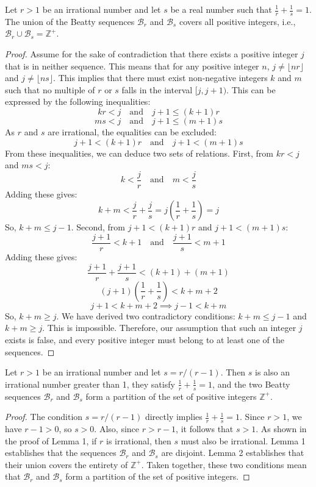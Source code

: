 \begin{lemma}
Let $r > 1$ be an irrational number and let $s$ be a real number such that $\frac{1}{r} + \frac{1}{s} = 1$. The union of the Beatty sequences $\mathcal{B}_r$ and $\mathcal{B}_s$ covers all positive integers, i.e., $\mathcal{B}_r \cup \mathcal{B}_s = \mathbb{Z}^+$.
\end{lemma}

\begin{proof}
Assume for the sake of contradiction that there exists a positive integer $j$ that is in neither sequence. This means that for any positive integer $n$, $j \neq \lfloor nr \rfloor$ and $j \neq \lfloor ns \rfloor$.
This implies that there must exist non-negative integers $k$ and $m$ such that no multiple of $r$ or $s$ falls in the interval $[j, j+1)$.
This can be expressed by the following inequalities:
$$kr < j \quad \text{and} \quad j+1 \leq (k+1)r$$
$$ms < j \quad \text{and} \quad j+1 \leq (m+1)s$$
As $r$ and $s$ are irrational, the equalities can be excluded:
$$j+1 < (k+1)r \quad \text{and} \quad j+1 < (m+1)s$$
From these inequalities, we can deduce two sets of relations. First, from $kr < j$ and $ms < j$:
$$k < \frac{j}{r} \quad \text{and} \quad m < \frac{j}{s}$$
Adding these gives:
$$k+m < \frac{j}{r} + \frac{j}{s} = j\left(\frac{1}{r} + \frac{1}{s}\right) = j$$
So, $k+m \le j-1$.
Second, from $j+1 < (k+1)r$ and $j+1 < (m+1)s$:
$$\frac{j+1}{r} < k+1 \quad \text{and} \quad \frac{j+1}{s} < m+1$$
Adding these gives:
$$\frac{j+1}{r} + \frac{j+1}{s} < (k+1) + (m+1)$$
$$(j+1)\left(\frac{1}{r} + \frac{1}{s}\right) < k+m+2$$
$$j+1 < k+m+2 \implies j-1 < k+m$$
So, $k+m \ge j$.
We have derived two contradictory conditions: $k+m \le j-1$ and $k+m \ge j$. This is impossible.
Therefore, our assumption that such an integer $j$ exists is false, and every positive integer must belong to at least one of the sequences.
\end{proof}

\begin{theorem}
Let $r > 1$ be an irrational number and let $s = r/(r-1)$. Then $s$ is also an irrational number greater than 1, they satisfy $\frac{1}{r} + \frac{1}{s} = 1$, and the two Beatty sequences $\mathcal{B}_r$ and $\mathcal{B}_s$ form a partition of the set of positive integers $\mathbb{Z}^+$.
\end{theorem}

\begin{proof}
The condition $s = r/(r-1)$ directly implies $\frac{1}{r} + \frac{1}{s} = 1$. Since $r > 1$, we have $r-1 > 0$, so $s > 0$. Also, since $r > r-1$, it follows that $s > 1$. As shown in the proof of Lemma 1, if $r$ is irrational, then $s$ must also be irrational.
Lemma 1 establishes that the sequences $\mathcal{B}_r$ and $\mathcal{B}_s$ are disjoint.
Lemma 2 establishes that their union covers the entirety of $\mathbb{Z}^+$.
Taken together, these two conditions mean that $\mathcal{B}_r$ and $\mathcal{B}_s$ form a partition of the set of positive integers.
\end{proof}
